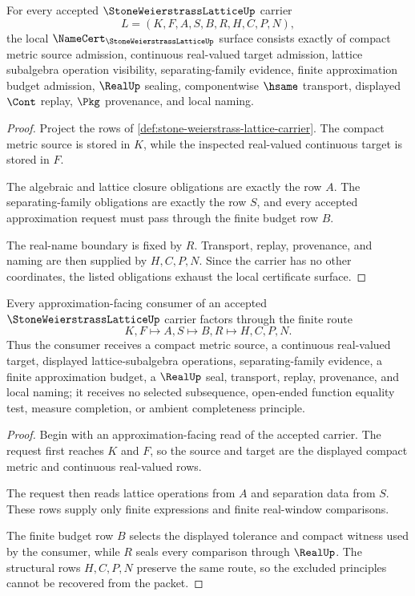 \begin{theorem}
\label{thm:stone-weierstrass-lattice-namecert-obligations}
For every accepted $\StoneWeierstrassLatticeUp$ carrier
$$
L=(K,F,A,S,B,R,H,C,P,N),
$$
the local $\NameCert_{\StoneWeierstrassLatticeUp}$ surface consists exactly of compact metric source admission, continuous real-valued target admission, lattice subalgebra operation visibility, separating-family evidence, finite approximation budget admission, $\RealUp$ sealing, componentwise $\hsame$ transport, displayed $\Cont$ replay, $\Pkg$ provenance, and local naming.
\end{theorem}
\begin{proof}
Project the rows of \autoref{def:stone-weierstrass-lattice-carrier}. The compact metric source is stored in $K$, while the inspected real-valued continuous target is stored in $F$.

The algebraic and lattice closure obligations are exactly the row $A$. The separating-family obligations are exactly the row $S$, and every accepted approximation request must pass through the finite budget row $B$.

The real-name boundary is fixed by $R$. Transport, replay, provenance, and naming are then supplied by $H,C,P,N$. Since the carrier has no other coordinates, the listed obligations exhaust the local certificate surface.
\end{proof}

\begin{theorem}
\label{thm:stone-weierstrass-lattice-uniform-approximation-route}
Every approximation-facing consumer of an accepted $\StoneWeierstrassLatticeUp$ carrier factors through the finite route
$$
K,F \longmapsto A,S \longmapsto B,R \longmapsto H,C,P,N .
$$
Thus the consumer receives a compact metric source, a continuous real-valued target, displayed lattice-subalgebra operations, separating-family evidence, a finite approximation budget, a $\RealUp$ seal, transport, replay, provenance, and local naming; it receives no selected subsequence, open-ended function equality test, measure completion, or ambient completeness principle.
\end{theorem}
\begin{proof}
Begin with an approximation-facing read of the accepted carrier. The request first reaches $K$ and $F$, so the source and target are the displayed compact metric and continuous real-valued rows.

The request then reads lattice operations from $A$ and separation data from $S$. These rows supply only finite expressions and finite real-window comparisons.

The finite budget row $B$ selects the displayed tolerance and compact witness used by the consumer, while $R$ seals every comparison through $\RealUp$. The structural rows $H,C,P,N$ preserve the same route, so the excluded principles cannot be recovered from the packet.
\end{proof}

